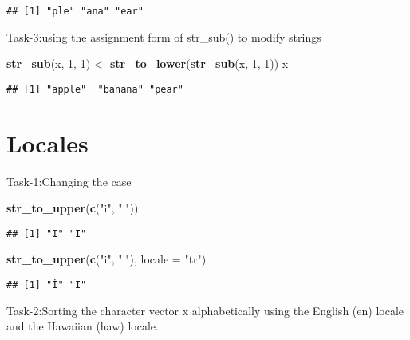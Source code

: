 \documentclass[
]{article}
\newenvironment{Shaded}{\begin{snugshade}}{\end{snugshade}}
\newcommand{\AttributeTok}[1]{\textcolor[rgb]{0.13,0.29,0.53}{#1}}
\newcommand{\DecValTok}[1]{\textcolor[rgb]{0.00,0.00,0.81}{#1}}
\newcommand{\FunctionTok}[1]{\textcolor[rgb]{0.13,0.29,0.53}{\textbf{#1}}}
\newcommand{\NormalTok}[1]{#1}
\newcommand{\OtherTok}[1]{\textcolor[rgb]{0.56,0.35,0.01}{#1}}
\newcommand{\StringTok}[1]{\textcolor[rgb]{0.31,0.60,0.02}{#1}}
\begin{document}
\begin{verbatim}
## [1] "ple" "ana" "ear"
\end{verbatim}

Task-3:using the assignment form of str\_sub() to modify strings

\begin{Shaded}
\begin{Highlighting}[]
\FunctionTok{str\_sub}\NormalTok{(x, }\DecValTok{1}\NormalTok{, }\DecValTok{1}\NormalTok{) }\OtherTok{\textless{}{-}} \FunctionTok{str\_to\_lower}\NormalTok{(}\FunctionTok{str\_sub}\NormalTok{(x, }\DecValTok{1}\NormalTok{, }\DecValTok{1}\NormalTok{))}
\NormalTok{x}
\end{Highlighting}
\end{Shaded}

\begin{verbatim}
## [1] "apple"  "banana" "pear"
\end{verbatim}

\hypertarget{locales}{%
\section{Locales}\label{locales}}

Task-1:Changing the case

\begin{Shaded}
\begin{Highlighting}[]
\FunctionTok{str\_to\_upper}\NormalTok{(}\FunctionTok{c}\NormalTok{(}\StringTok{"i"}\NormalTok{, }\StringTok{"ı"}\NormalTok{))}
\end{Highlighting}
\end{Shaded}

\begin{verbatim}
## [1] "I" "I"
\end{verbatim}

\begin{Shaded}
\begin{Highlighting}[]
\FunctionTok{str\_to\_upper}\NormalTok{(}\FunctionTok{c}\NormalTok{(}\StringTok{"i"}\NormalTok{, }\StringTok{"ı"}\NormalTok{), }\AttributeTok{locale =} \StringTok{"tr"}\NormalTok{)}
\end{Highlighting}
\end{Shaded}

\begin{verbatim}
## [1] "İ" "I"
\end{verbatim}

Task-2:Sorting the character vector x alphabetically using the English
(en) locale and the Hawaiian (haw) locale.
\end{document}
